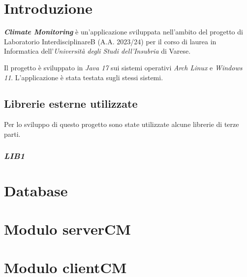 \documentclass[fontsize=12pt,a4paper,DIV=16]{scrreprt}
\author{
	\\Iuri Antico \textsl{matricola}:
	\texttt{753144}
	\and \\
	Beatrice Balzarini \textsl{matricola}:
	\texttt{752257}
	\and \\
	Michael Bernasconi \textsl{matricola}:
	\texttt{752259}
	\and \\
	Gabriele Borgia \textsl{matricola}:
	\texttt{753262}\\\\
}
\begin{document}
	\maketitle
	\tableofcontents
	
	\chapter{Introduzione}
		\textsl{\textbf{Climate Monitoring}} \`e un'applicazione sviluppata nell’ambito del progetto di Laboratorio InterdisciplinareB (A.A. 2023/24) per il corso di laurea in Informatica dell’\textsl{Universit\`a degli Studi dell’Insubria} di Varese.

		Il progetto \`e sviluppato in \textsl{Java 17} sui sistemi operativi \textsl{Arch Linux} e \textsl{Windows 11}.
		L'applicazione \`e stata testata sugli stessi sistemi.
	\section{Librerie esterne utilizzate}
	Per lo sviluppo di questo progetto sono state utilizzate alcune librerie di terze parti.
	\subsection{\textsl{LIB1}}
	\chapter{Database}
	\chapter{Modulo serverCM}
	\chapter{Modulo clientCM}
	
	\nocite{IuriTex}
	
	
\end{document}
